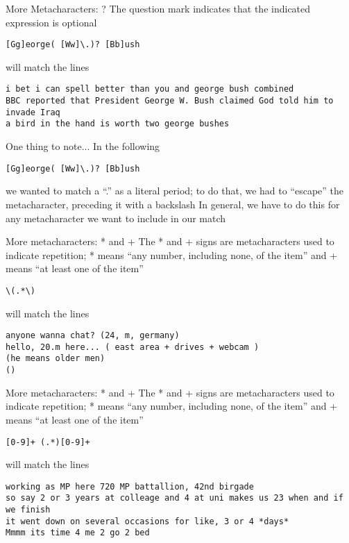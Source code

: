 \documentclass[aspectratio=169]{beamer}
\begin{document}
\begin{frame}[fragile]{More Metacharacters: ?}
The question mark indicates that the indicated expression is optional
\begin{verbatim}
[Gg]eorge( [Ww]\.)? [Bb]ush
\end{verbatim}
will match the lines 
\begin{verbatim}
i bet i can spell better than you and george bush combined
BBC reported that President George W. Bush claimed God told him to invade Iraq 
a bird in the hand is worth two george bushes 
\end{verbatim}
\end{frame}

\begin{frame}[fragile]{One thing to note...}
In the following
\begin{verbatim}
[Gg]eorge( [Ww]\.)? [Bb]ush
\end{verbatim}
we wanted to match a ``.'' as a literal period; to do that, we had to
``escape'' the metacharacter, preceding it with a backslash In
general, we have to do this for any metacharacter we want to include
in our match
\end{frame}

\begin{frame}[fragile]{More metacharacters: * and +}
The * and + signs are metacharacters used to indicate repetition; * 
means ``any number, including none, of the item'' and + means ``at 
least one of the item''
\begin{verbatim}
\(.*\)
\end{verbatim}
will match the lines 
\begin{verbatim}
anyone wanna chat? (24, m, germany)
hello, 20.m here... ( east area + drives + webcam ) 
(he means older men) 
()
\end{verbatim}
\end{frame}

\begin{frame}[fragile]{More metacharacters: * and +}
The * and + signs are metacharacters used to indicate repetition; * 
means ``any number, including none, of the item'' and + means ``at 
least one of the item''
\begin{verbatim}
[0-9]+ (.*)[0-9]+
\end{verbatim}
will match the lines 
\begin{verbatim}
working as MP here 720 MP battallion, 42nd birgade 
so say 2 or 3 years at colleage and 4 at uni makes us 23 when and if we finish
it went down on several occasions for like, 3 or 4 *days*
Mmmm its time 4 me 2 go 2 bed
\end{verbatim}
\end{frame}
\end{document}
